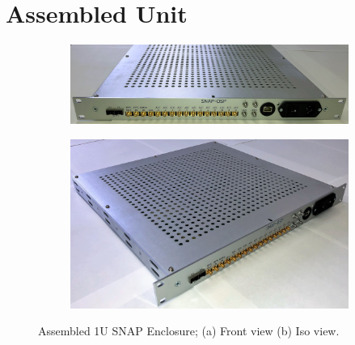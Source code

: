\documentclass[12pt,a4paper,oneside]{article}
\begin{document}
\section{Assembled Unit}
\label{sec:6}
\begin{figure}[H]
\centering
   \begin{subfigure}[b]{1\textwidth}
   \includegraphics[width=1\linewidth]{figures/front.jpeg}
   \caption{}
   \label{fig:front-view} 
\end{subfigure}
\begin{subfigure}[b]{1\textwidth}
	\vspace{1cm}
   \includegraphics[width=1\linewidth]{figures/iso-closed.jpeg}
   \caption{}
   \label{fig:iso-view}
\end{subfigure}
\caption[Three numerical solutions]{Assembled 1U SNAP Enclosure; (a) Front view (b) Iso view.}
\label{fig:assembled-unit}
\end{figure}
\end{document}
